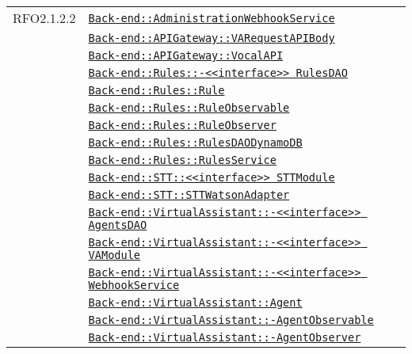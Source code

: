 \begin{longtable}{|>{\centering}m{3cm}|m{10cm}<{\centering}|}
RFO2.1.2.2 & \hyperref[Back-end::AdministrationWebhookService]{\texttt{Back-end::AdministrationWebhookService}}\\
& \hyperref[Back-end::APIGateway::VARequestAPIBody]{\texttt{Back-end::APIGateway::VARequestAPIBody}}\\
& \hyperref[Back-end::APIGateway::VocalAPI]{\texttt{Back-end::APIGateway::VocalAPI}}\\
& \hyperref[Back-end::Rules::<<interface>> RulesDAO]{\texttt{Back-end::Rules::-\linebreak <<interface>> RulesDAO}}\\
& \hyperref[Back-end::Rules::Rule]{\texttt{Back-end::Rules::Rule}}\\
& \hyperref[Back-end::Rules::RuleObservable]{\texttt{Back-end::Rules::RuleObservable}}\\
& \hyperref[Back-end::Rules::RuleObserver]{\texttt{Back-end::Rules::RuleObserver}}\\
& \hyperref[Back-end::Rules::RulesDAODynamoDB]{\texttt{Back-end::Rules::RulesDAODynamoDB}}\\
& \hyperref[Back-end::Rules::RulesService]{\texttt{Back-end::Rules::RulesService}}\\
& \hyperref[Back-end::STT::<<interface>> STTModule]{\texttt{Back-end::STT::<<interface>> STTModule}}\\
& \hyperref[Back-end::STT::STTWatsonAdapter]{\texttt{Back-end::STT::STTWatsonAdapter}}\\
& \hyperref[Back-end::VirtualAssistant::<<interface>> AgentsDAO]{\texttt{Back-end::VirtualAssistant::-\linebreak <<interface>> AgentsDAO}}\\
& \hyperref[Back-end::VirtualAssistant::<<interface>> VAModule]{\texttt{Back-end::VirtualAssistant::-\linebreak <<interface>> VAModule}}\\
& \hyperref[Back-end::VirtualAssistant::<<interface>> WebhookService]{\texttt{Back-end::VirtualAssistant::-\linebreak <<interface>> WebhookService}}\\
& \hyperref[Back-end::VirtualAssistant::Agent]{\texttt{Back-end::VirtualAssistant::Agent}}\\
& \hyperref[Back-end::VirtualAssistant::AgentObservable]{\texttt{Back-end::VirtualAssistant::-\linebreak AgentObservable}}\\
& \hyperref[Back-end::VirtualAssistant::AgentObserver]{\texttt{Back-end::VirtualAssistant::-\linebreak AgentObserver}}\\

\end{longtable}
